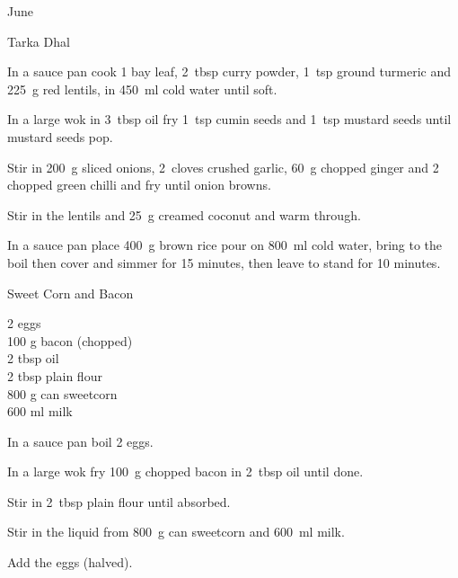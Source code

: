 \begin{menu}{June}
\begin{recipe}{2}{Tarka Dhal}
	
    \begin{instructions}
    \item 
        In a sauce pan cook
        1  bay leaf,
        2~tbsp  curry powder,
        1~tsp  ground turmeric
        and
        225~g  red lentils,
        in
        450~ml  cold water
        until soft.
      \item 
        In a large wok in
        3~tbsp  oil
        fry
        1~tsp  cumin seeds
        and
        1~tsp  mustard seeds
        until mustard seeds pop.
      \item 
        Stir in
        200~g sliced onions,
        2~cloves crushed garlic,
        60~g chopped ginger
        and
        2 chopped green chilli
        and
        fry until onion browns.
      \item 
        Stir in the lentils
        and
        25~g  creamed coconut
        and warm through.
      \item 
    In a
    sauce pan
    place
    400~g  brown rice
    pour on
    800~ml  cold water,
    bring to the boil then cover and simmer for 15 minutes,
    then leave to stand for 10 minutes.
  
    \end{instructions}
    \end{recipe}%
  
    \begin{recipe}{1}{Sweet Corn and Bacon}%
		\begin{ingredients}
		2  eggs  \\
	100 g bacon (chopped) \\
	2 tbsp oil  \\
	2 tbsp plain flour  \\
	800 g can sweetcorn  \\
	600 ml milk  \\
	
		\end{ingredients}
	
	
    \begin{instructions}
    \item 
        In a sauce pan boil
        2  eggs.
      \item 
        In a large wok fry
        100~g chopped bacon
        in
        2~tbsp  oil
        until done.
      \item 
        Stir in
        2~tbsp  plain flour
        until absorbed.
      \item 
        Stir in the liquid from
        800~g  can sweetcorn
        and
        600~ml  milk.
      \item 
        Add the eggs (halved).
      
    \end{instructions}
    \end{recipe}%
  
    \clearpage
    \end{menu}
	
